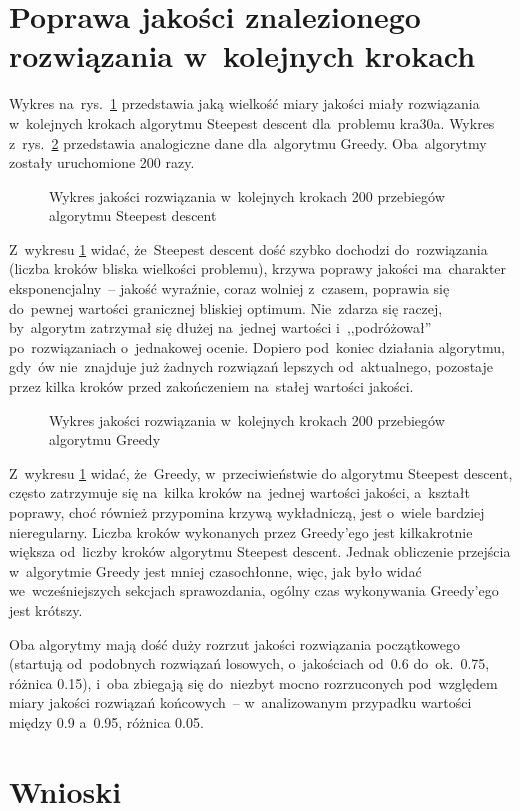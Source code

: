 \documentclass[a4paper,10pt]{article}
\begin{document}
\section{Poprawa jakości znalezionego rozwiązania w~kolejnych krokach}
Wykres na~rys.~\ref{fig:steephistkra30a} przedstawia jaką wielkość miary jakości miały rozwiązania w~kolejnych krokach
algorytmu Steepest descent dla~problemu kra30a. Wykres z~rys.~\ref{fig:greedyhistkra30a} przedstawia analogiczne dane
dla~algorytmu Greedy. Oba~algorytmy zostały uruchomione 200 razy.

\begin{figure}[!htpb]
\begin{center}

\caption{Wykres jakości rozwiązania w~kolejnych krokach 200 przebiegów algorytmu Steepest descent}
\label{fig:steephistkra30a}
\end{center}
\end{figure}

Z~wykresu \ref{fig:steephistkra30a} widać, że~Steepest descent dość szybko dochodzi do~rozwiązania (liczba kroków bliska wielkości problemu),
krzywa poprawy jakości ma~charakter eksponencjalny~-- jakość wyraźnie, coraz wolniej z~czasem,
poprawia się do~pewnej wartości granicznej bliskiej optimum. Nie~zdarza się raczej, by~algorytm zatrzymał się dłużej
na~jednej wartości i~,,podróżował'' po~rozwiązaniach o~jednakowej ocenie. Dopiero pod~koniec działania algorytmu, gdy~ów
nie~znajduje już żadnych rozwiązań lepszych od~aktualnego, pozostaje przez kilka kroków przed zakończeniem na~stałej
wartości jakości.

\begin{figure}[!htpb]
\begin{center}

\caption{Wykres jakości rozwiązania w~kolejnych krokach 200 przebiegów algorytmu Greedy}
\label{fig:greedyhistkra30a}
\end{center}
\end{figure}

Z~wykresu \ref{fig:steephistkra30a} widać, że~Greedy, w~przeciwieństwie do algorytmu Steepest descent, często
zatrzymuje się na~kilka kroków na~jednej wartości jakości, a~kształt poprawy, choć również przypomina krzywą wykładniczą, jest o~wiele
bardziej nieregularny. Liczba kroków wykonanych przez Greedy'ego jest kilkakrotnie większa od~liczby kroków algorytmu Steepest descent.
Jednak obliczenie przejścia w~algorytmie Greedy jest mniej czasochłonne, więc, jak było widać we~wcześniejszych sekcjach sprawozdania,
ogólny czas wykonywania Greedy'ego jest krótszy.

Oba algorytmy mają dość duży rozrzut jakości rozwiązania początkowego (startują od~podobnych rozwiązań losowych, o~jakościach
od~\num{0.6} do~ok.~\num{0.75}, różnica \num{0.15}), i~oba zbiegają się do~niezbyt mocno rozrzuconych pod~względem miary jakości rozwiązań końcowych~--
w~analizowanym przypadku wartości między \num{0.9} a~\num{0.95}, różnica \num{0.05}.

\section{Wnioski}
\end{document}
